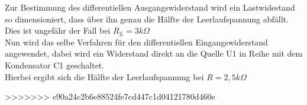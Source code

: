 \documentclass{article}
\begin{document}
Zur Bestimmung des differentiellen Ausgangswiderstand wird ein Lastwidestand so dimensioniert, dass über ihn genau die Hälfte der Leerlaufspannung abfällt.
\\ Dies ist ungefähr der Fall bei $R_L = 3k\Omega$\\
Nun wird das selbe Verfahren für den differentiellen Eingangswiderstand angewendet, dabei wird ein Widerstand direkt an die Quelle U1 in Reihe mit dem Kondensator C1 geschaltet. 
\\ Hierbei ergibt sich die Hälfte der Leerlaufspannung bei $R = 2,5k\Omega$


>>>>>>> e90a24c2b6e88524fe7cd447c1d04121780d460e
\end{document}
